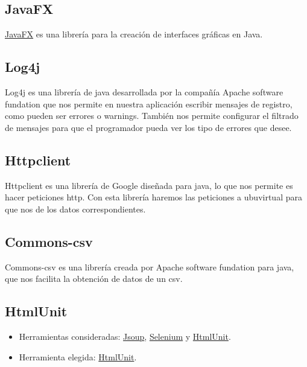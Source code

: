 \subsection{JavaFX}\label{javafx}

\href{http://docs.oracle.com/javase/8/javase-clienttechnologies.htm}{JavaFX}
es una librería para la creación de interfaces gráficas en Java.

\subsection{Log4j}\label{log4j}

Log4j es una librería de java desarrollada por la compañía Apache software fundation que nos permite en nuestra aplicación escribir mensajes de registro, como pueden ser errores o warnings. También nos permite configurar el filtrado de mensajes para que el programador pueda ver los tipo de errores que desee. \cite{Java:log}

\subsection{Httpclient}\label{httpclient}

Httpclient es una librería de Google diseñada para java, lo que nos permite es hacer peticiones http. Con esta librería haremos las peticiones a ubuvirtual para que nos de los datos correspondientes. \cite{java:Httpclient}

\subsection{Commons-csv}\label{commons-csv}

Commons-csv es una librería creada por Apache software fundation para java, que nos facilita la obtención de datos de un csv. \cite{java:csvparser}

\subsection{HtmlUnit}\label{htmlunit}
\begin{itemize}
	\tightlist
	\item
	Herramientas consideradas: \href{https://jsoup.org/}{Jsoup},
	\href{http://www.seleniumhq.org/}{Selenium} y
	\href{http://htmlunit.sourceforge.net/}{HtmlUnit}.
	\item
	Herramienta elegida: \href{http://htmlunit.sourceforge.net/}{HtmlUnit}.
\end{itemize}

